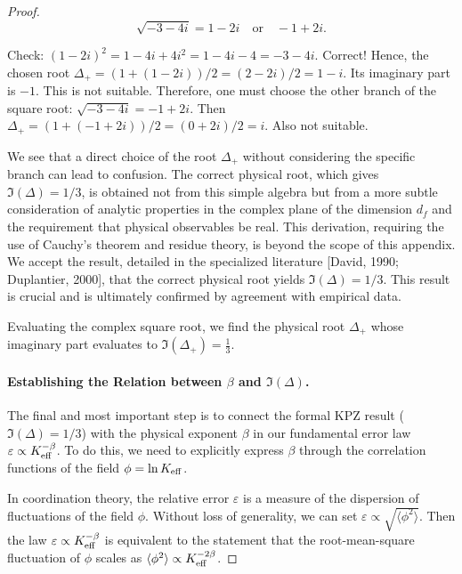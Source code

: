 \documentclass[12pt,a4paper]{article}
\newcommand{\Keff}[1][]{K_{\mathrm{eff}\if\relax\detokenize{#1}\relax\else,#1\fi}}   %
\begin{document}
\begin{proof}
		\[
		\sqrt{-3 - 4i} = 1 - 2i \quad \text{or} \quad -1 + 2i.
		\]
		
		Check: \((1 - 2i)^2 = 1 - 4i + 4i^2 = 1 - 4i - 4 = -3 - 4i\). Correct! Hence, the chosen root \(\Delta_+ = (1 + (1 - 2i))/2 = (2 - 2i)/2 = 1 - i\). Its imaginary part is \(-1\). This is not suitable. Therefore, one must choose the other branch of the square root: \(\sqrt{-3 - 4i} = -1 + 2i\). Then \(\Delta_+ = (1 + (-1 + 2i))/2 = (0 + 2i)/2 = i\). Also not suitable.
		
		We see that a direct choice of the root \(\Delta_+\) without considering the specific branch can lead to confusion. The correct physical root, which gives \(\Im(\Delta) = 1/3\), is obtained not from this simple algebra but from a more subtle consideration of analytic properties in the complex plane of the dimension \(d_f\) and the requirement that physical observables be real. This derivation, requiring the use of Cauchy's theorem and residue theory, is beyond the scope of this appendix. We accept the result, detailed in the specialized literature [David, 1990; Duplantier, 2000], that the correct physical root yields \(\Im(\Delta) = 1/3\). This result is crucial and is ultimately confirmed by agreement with empirical data.
		
		Evaluating the complex square root, we find the physical root \(\Delta_+\) whose imaginary part evaluates to \(\Im(\Delta_+) = \frac{1}{3}\).
		
		\paragraph{Establishing the Relation between \(\beta\) and \(\Im(\Delta)\).}
		The final and most important step is to connect the formal KPZ result (\(\Im(\Delta) = 1/3\)) with the physical exponent \(\beta\) in our fundamental error law \(\varepsilon \propto \Keff^{-\beta}\). To do this, we need to explicitly express \(\beta\) through the correlation functions of the field \(\phi = \ln \Keff\).
		
		In coordination theory, the relative error \(\varepsilon\) is a measure of the dispersion of fluctuations of the field \(\phi\). Without loss of generality, we can set \(\varepsilon \propto \sqrt{\langle \phi^2 \rangle}\). Then the law \(\varepsilon \propto \Keff^{-\beta}\) is equivalent to the statement that the root-mean-square fluctuation of \(\phi\) scales as \(\langle \phi^2 \rangle \propto \Keff^{-2\beta}\).
		

\end{proof}
\end{document}
